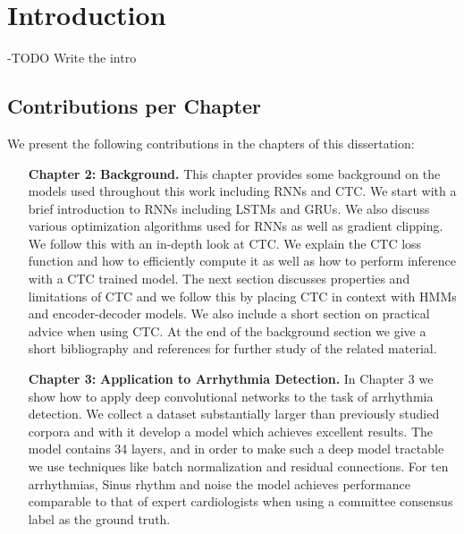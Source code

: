 \chapter{Introduction}

-TODO Write the intro

\section{Contributions per Chapter}

We present the following contributions in the chapters of this dissertation:

\begin{itemize}
    \setlength{\itemindent}{3.4em}
    \item[{\bf Chapter 2:}]{\bf Background.} This chapter provides some
        background on the models used throughout this work including RNNs and
        CTC. We start with a brief introduction to RNNs including LSTMs and
        GRUs. We also discuss various optimization algorithms used for RNNs as
        well as gradient clipping. We follow this with an in-depth look at CTC.
        We explain the CTC loss function and how to efficiently compute it as
        well as how to perform inference with a CTC trained model. The next
        section discusses properties and limitations of CTC and we follow this
        by placing CTC in context with HMMs and encoder-decoder models. We also
        include a short section on practical advice when using CTC. At the end
        of the background section we give a short bibliography and references
        for further study of the related material. 

    \item [{\bf Chapter 3:}]{\bf Application to Arrhythmia Detection.} In
        Chapter 3 we show how to apply deep convolutional networks to the task
        of arrhythmia detection. We collect a dataset substantially larger than
        previously studied corpora and with it develop a model which achieves
        excellent results. The model contains 34 layers, and in order to make
        such a deep model tractable we use techniques like batch normalization
        and residual connections. For ten arrhythmias, Sinus rhythm and noise
        the model achieves performance comparable to that of expert
        cardiologists when using a committee consensus label as the ground
        truth.


\end{itemize}
